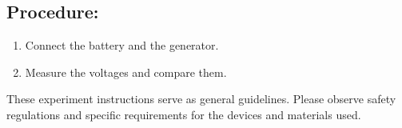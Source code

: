 \documentclass[]{scrreprt}
\begin{document}
    \subsection*{Procedure:}
    \begin{enumerate}
        \item Connect the battery and the generator.
        \item Measure the voltages and compare them.
    \end{enumerate}


    These experiment instructions serve as general guidelines. Please observe safety regulations and specific requirements for the devices and materials used.


















\printglossaries
\end{document}
